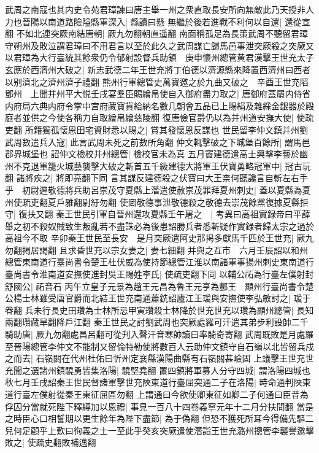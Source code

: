 武周之南寇也其内史令苑君璋諫曰唐主舉一州之衆直取長安所向無敵此乃天授非人力也晉陽以南道路險隘縣軍深入|{
	縣讀曰懸}
無繼於後若進戰不利何以自還|{
	還從宣翻}
不如北連突厥南結唐朝|{
	厥九勿翻朝直遥翻}
南面稱孤足為長策武周不聽留君璋守朔州及敗泣謂君璋曰不用君言以至於此久之武周謀亡歸馬邑事泄突厥殺之突厥又以君璋為大行臺統其餘衆仍令郁射設督兵助鎮　庚申懷州總管黄君漢擊王世充太子玄應於西濟州大破之|{
	新志武德二年王世充將丁伯德以濟源縣來降置西濟州曰西者以别濟北之濟州濟子禮翻}
熊州行軍總管史萬寶邀之於九曲又破之　辛酉王世充䧟鄧州　上聞并州平大悦壬戌宴羣臣賜繒帛使自入御府盡力取之|{
	唐御府蓋屬内侍省内府局六典内府令掌中宫府藏寶貨給納名數几朝會五品已上賜絹及雜綵金銀器於殿庭者並供之今使各稱力自取繒帛繒慈陵翻}
復唐儉官爵仍以為并州道安撫大使|{
	使疏吏翻}
所籍獨孤懷恩田宅資財悉以賜之|{
	賞其發懷恩反謀也}
世民留李仲文鎮并州劉武周數遣兵入寇|{
	此言武周未死之前數所角翻}
仲文輒擊破之下城堡百餘所|{
	謂馬邑郡界城堡也}
詔仲文檢校并州總管|{
	檢校官未為真}
五月竇建德遣高士興擊李藝於幽州不克退軍籠火城藝襲擊大破之斬首五千級建德大將軍王伏寶勇略冠軍中|{
	冠古玩翻}
諸將疾之|{
	將即亮翻下同}
言其謀反建德殺之伏寶曰大王柰何聽讒言自斬左右手乎　初尉遲敬德將兵助呂崇茂守夏縣上濳遣使赦崇茂罪拜夏州刺史|{
	蓋以夏縣為夏州使疏吏翻夏戶雅翻尉紆勿翻}
使圖敬德事泄敬德殺之敬德去崇茂餘黨復據夏縣拒守|{
	復扶又翻}
秦王世民引軍自晉州還攻夏縣壬午屠之　|{
	考異曰高祖實録帝曰平薛舉之初不殺奴賊致生叛亂若不盡誅必為後患詔勝兵者悉斬疑作實録者歸太宗之過於高祖今不取}
辛卯秦王世民至長安　是月突厥遣阿史那掲多獻馬千匹於王世充|{
	厥九勿翻掲居謁翻}
且求昏世充以宗女妻之|{
	妻七細翻}
并與之互市　六月壬辰詔以和州總管東南道行臺尚書令楚王杜伏威為使持節總管江淮以南諸軍事揚州刺史東南道行臺尚書令淮南道安撫使進封吳王賜姓李氏|{
	使疏吏翻下同}
以輔公祏為行臺左僕射封舒國公|{
	祏音石}
丙午立皇子元景為趙王元昌為魯王元亨為酆王　顯州行臺尚書令楚公楊士林雖受唐官爵而北結王世充南通蕭銑詔廬江王瑗與安撫使李弘敏討之|{
	瑗于眷翻}
兵未行長史田瓚為士林所忌甲寅瓚殺士林降於世充世充以瓚為顯州總管|{
	長知兩翻瓚藏旱翻降戶江翻}
秦王世民之討劉武周也突厥處羅可汗遣其弟步利設帥二千騎助唐|{
	厥九勿翻處昌呂翻可從刋入聲汗音寒帥讀曰率騎奇寄翻}
武周既敗是月處羅至晉陽總管李仲文不能制又留倫特勒使將數百人云助仲文鎮守自石嶺以北皆留兵戍之而去|{
	石嶺關在代州杜佑曰忻州定襄縣漢陽曲縣有石嶺關甚嶮固}
上議擊王世充世充聞之選諸州鎮驍勇皆集洛陽|{
	驍堅堯翻}
置四鎮將軍募人分守四城|{
	謂洛陽四城也}
秋七月壬戌詔秦王世民督諸軍擊世充陜東道行臺屈突通二子在洛陽|{
	時命通判陜東道行臺左僕射從秦王東征屈區勿翻}
上謂通曰今欲使卿東征如卿二子何通曰臣昔為俘囚分當就死陛下釋縛加以恩禮|{
	事見一百八十四卷義寧元年十二月分扶問翻}
當是之時臣心口相誓期以更生餘年為陛下盡節|{
	為于偽翻}
但恐不獲死所耳今得備先驅二兒何足顧乎上歎曰徇義之士一至此乎癸亥突厥遣使濳詣王世充潞州摠管李襲譽邀擊敗之|{
	使疏史翻敗補邁翻}
